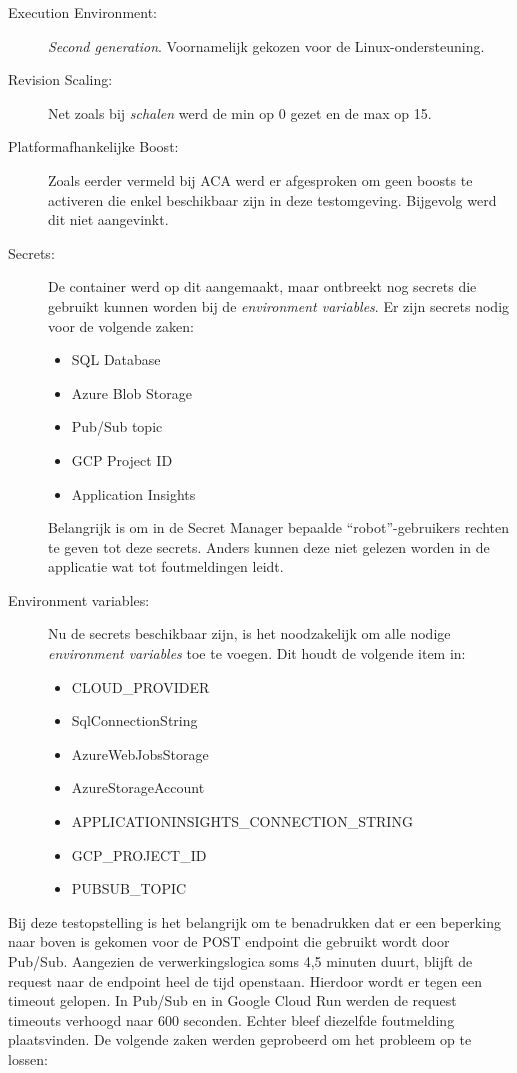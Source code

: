 \begin{description}
    \item[Execution Environment:] 
    \textit{Second generation}. Voornamelijk gekozen voor de Linux-ondersteuning.
    \item[Revision Scaling:] 
    Net zoals bij \textit{schalen} werd de min op 0 gezet en de max op 15.
    \item[Platformafhankelijke Boost:] 
    Zoals eerder vermeld bij ACA werd er afgesproken om geen boosts te activeren die enkel beschikbaar zijn in deze testomgeving. Bijgevolg werd dit niet aangevinkt.
    \item[Secrets:] 
    De container werd op dit aangemaakt, maar ontbreekt nog secrets die gebruikt kunnen worden bij de \textit{environment variables}. Er zijn secrets nodig voor de volgende zaken:
    \begin{itemize}
        \item SQL Database
        \item Azure Blob Storage
        \item Pub/Sub topic
        \item GCP Project ID
        \item Application Insights
    \end{itemize}
    Belangrijk is om in de Secret Manager bepaalde ``robot''-gebruikers rechten te geven tot deze secrets. Anders kunnen deze niet gelezen worden in de applicatie wat tot foutmeldingen leidt.
    \item[Environment variables:] 
    Nu de secrets beschikbaar zijn, is het noodzakelijk om alle nodige \textit{environment variables} toe te voegen. Dit houdt de volgende item in:
    \begin{itemize}
        \item CLOUD\_PROVIDER
        \item SqlConnectionString
        \item AzureWebJobsStorage
        \item AzureStorageAccount
        \item APPLICATIONINSIGHTS\_CONNECTION\_STRING
        \item GCP\_PROJECT\_ID
        \item PUBSUB\_TOPIC
    \end{itemize}
\end{description}

Bij deze testopstelling is het belangrijk om te benadrukken dat er een beperking naar boven is gekomen voor de POST endpoint die gebruikt wordt door Pub/Sub. Aangezien de verwerkingslogica soms 4,5 minuten duurt, blijft de request naar de endpoint heel de tijd openstaan. Hierdoor wordt er tegen een timeout gelopen. In Pub/Sub en in Google Cloud Run werden de request timeouts verhoogd naar 600 seconden. Echter bleef diezelfde foutmelding plaatsvinden. De volgende zaken werden geprobeerd om het probleem op te lossen:

